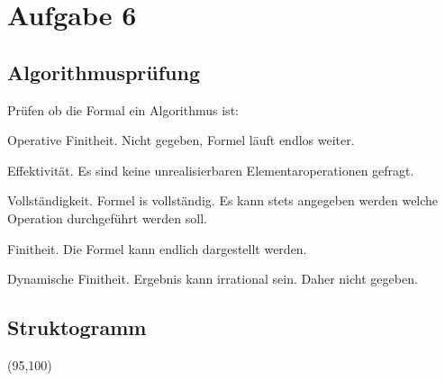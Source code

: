 \documentclass[11pt]{article} %
\begin{document}
\newpage

\section{Aufgabe 6}

\subsection{Algorithmusprüfung}
Prüfen ob die Formal ein Algorithmus ist:

Operative Finitheit.
Nicht gegeben, Formel läuft endlos weiter.

Effektivität.
Es sind keine unrealisierbaren Elementaroperationen gefragt.

Vollständigkeit.
Formel is vollständig. Es kann stets angegeben werden welche Operation durchgeführt werden soll.

Finitheit.
Die Formel kann endlich dargestellt werden.

Dynamische Finitheit.
Ergebnis kann irrational sein. Daher nicht gegeben.

\subsection{Struktogramm}

\sProofOn
\begin{struktogramm}(95,100)
		\whileend
	\whileend
\end{struktogramm}
\sProofOff
\\
\end{document}
